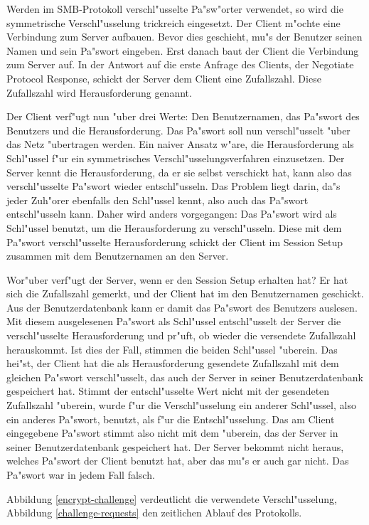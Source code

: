 \documentclass{scrartcl}\usepackage{pslatex}\typearea{12}
\begin{document}
Werden im SMB-Protokoll verschl"usselte Pa"sw"orter verwendet, so wird
die symmetrische Verschl"usselung trickreich eingesetzt. Der Client
m"ochte eine Verbindung zum Server aufbauen. Bevor dies geschieht,
mu"s der Benutzer seinen Namen und sein Pa"swort eingeben. Erst danach
baut der Client die Verbindung zum Server auf. In der Antwort auf die
erste Anfrage des Clients, der Negotiate Protocol Response, schickt
der Server dem Client eine Zufallszahl. Diese Zufallszahl wird
Herausforderung genannt.

Der Client verf"ugt nun "uber drei Werte: Den Benutzernamen, das
Pa"swort des Benutzers und die Herausforderung. Das Pa"swort soll nun
verschl"usselt "uber das Netz "ubertragen werden. Ein naiver Ansatz
w"are, die Herausforderung als Schl"ussel f"ur ein symmetrisches
Verschl"usselungsverfahren einzusetzen. Der Server kennt die
Herausforderung, da er sie selbst verschickt hat, kann also das
verschl"usselte Pa"swort wieder entschl"usseln. Das Problem liegt
darin, da"s jeder Zuh"orer ebenfalls den Schl"ussel kennt, also auch
das Pa"swort entschl"usseln kann. Daher wird anders vorgegangen: Das
Pa"swort wird als Schl"ussel benutzt, um die Herausforderung zu
verschl"usseln. Diese mit dem Pa"swort verschl"usselte Herausforderung
schickt der Client im Session Setup zusammen mit dem Benutzernamen an
den Server.

Wor"uber verf"ugt der Server, wenn er den Session Setup erhalten hat?
Er hat sich die Zufallszahl gemerkt, und der Client hat im den
Benutzernamen geschickt. Aus der Benutzerdatenbank kann er damit das
Pa"swort des Benutzers auslesen. Mit diesem ausgelesenen Pa"swort als
Schl"ussel entschl"usselt der Server die verschl"usselte
Herausforderung und pr"uft, ob wieder die versendete Zufallszahl
herauskommt. Ist dies der Fall, stimmen die beiden Schl"ussel
"uberein. Das hei"st, der Client hat die als Herausforderung gesendete
Zufallszahl mit dem gleichen Pa"swort verschl"usselt, das auch der
Server in seiner Benutzerdatenbank gespeichert hat. Stimmt der
entschl"usselte Wert nicht mit der gesendeten Zufallszahl "uberein,
wurde f"ur die Verschl"usselung ein anderer Schl"ussel, also ein
anderes Pa"swort, benutzt, als f"ur die Entschl"usselung. Das am
Client eingegebene Pa"swort stimmt also nicht mit dem "uberein, das
der Server in seiner Benutzerdatenbank gespeichert hat. Der Server
bekommt nicht heraus, welches Pa"swort der Client benutzt hat, aber
das mu"s er auch gar nicht. Das Pa"swort war in jedem Fall falsch.

Abbildung \ref{encrypt-challenge} verdeutlicht die verwendete
Verschl"usselung, Abbildung \ref{challenge-requests} den zeitlichen
Ablauf des Protokolls.
\end{document}
